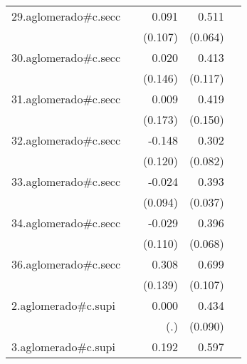 {\begin{longtable}{l*{4}{D{.}{.}{-1}}}
\addlinespace
29.aglomerado#c.secc&                     &       0.091         &       0.511\sym{***}&                     \\
            &                     &     (0.107)         &     (0.064)         &                     \\
\addlinespace
30.aglomerado#c.secc&                     &       0.020         &       0.413\sym{***}&                     \\
            &                     &     (0.146)         &     (0.117)         &                     \\
\addlinespace
31.aglomerado#c.secc&                     &       0.009         &       0.419\sym{**} &                     \\
            &                     &     (0.173)         &     (0.150)         &                     \\
\addlinespace
32.aglomerado#c.secc&                     &      -0.148         &       0.302\sym{***}&                     \\
            &                     &     (0.120)         &     (0.082)         &                     \\
\addlinespace
33.aglomerado#c.secc&                     &      -0.024         &       0.393\sym{***}&                     \\
            &                     &     (0.094)         &     (0.037)         &                     \\
\addlinespace
34.aglomerado#c.secc&                     &      -0.029         &       0.396\sym{***}&                     \\
            &                     &     (0.110)         &     (0.068)         &                     \\
\addlinespace
36.aglomerado#c.secc&                     &       0.308\sym{*}  &       0.699\sym{***}&                     \\
            &                     &     (0.139)         &     (0.107)         &                     \\
\addlinespace
2.aglomerado#c.supi&                     &       0.000         &       0.434\sym{***}&                     \\
            &                     &         (.)         &     (0.090)         &                     \\
\addlinespace
3.aglomerado#c.supi&                     &       0.192         &       0.597\sym{***}&                     \\

\end{longtable}}

